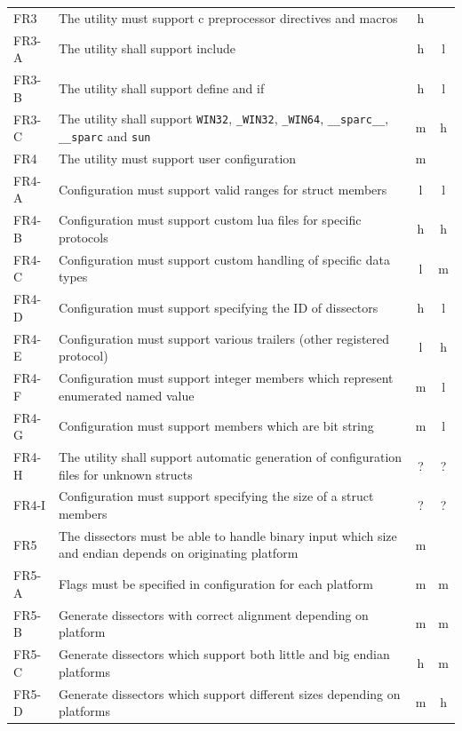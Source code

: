 \begin{table}[htbp]
{\begin{tabularx}{1.2\textwidth}{l X c c}
	\midrule
	FR3 & The \gls{utility} must support \Gls{c} \gls{preprocessor} directives and macros & \Gls{h} & \\
	FR3-A & The \gls{utility} shall support \gls{include} & \Gls{h} & \Gls{l} \\
	FR3-B & The \gls{utility} shall support \gls{define} and \gls{if} & \Gls{h} & \Gls{l} \\
	FR3-C & The \gls{utility} shall support \verb+WIN32+, \verb+_WIN32+, \verb+_WIN64+, \verb+__sparc__+, \verb+__sparc+ and \verb+sun+ & \Gls{m} & \Gls{h} \\
	\midrule
	FR4 & The \gls{utility} must support user configuration & \Gls{m} & \\
	FR4-A & Configuration must support valid ranges for \gls{struct} \glspl{member} & \Gls{l} & \Gls{l} \\
	FR4-B & Configuration must support custom \Gls{lua} files for specific \glspl{protocol} & \Gls{h} & \Gls{h} \\
	FR4-C & Configuration must support custom handling of specific data types & \Gls{l} & \Gls{m} \\
	FR4-D & Configuration must support specifying the ID of \glspl{dissector} & \Gls{h} & \Gls{l} \\
	FR4-E & Configuration must support various trailers (other registered \gls{protocol}) & \Gls{l} & \Gls{h} \\
	FR4-F & Configuration must support integer \glspl{member} which represent enumerated named value & \Gls{m} & \Gls{l} \\	
	FR4-G & Configuration must support \glspl{member} which are \gls{bit string} & \Gls{m} & \Gls{l} \\
	FR4-H & The utility shall support automatic generation of configuration files for unknown structs & ? & ? \\
	FR4-I & Configuration must support specifying the size of a struct members & ? & ? \\
	\midrule
	FR5 & The \glspl{dissector} must be able to handle \gls{binary} input which size and \gls{endian} depends on originating platform & \Gls{m} & \\
	FR5-A & Flags must be specified in configuration for each platform & \Gls{m} & \Gls{m} \\
	FR5-B & Generate \glspl{dissector} with correct alignment depending on platform & \Gls{m} & \Gls{m} \\
	FR5-C & Generate \glspl{dissector} which support both little and big \gls{endian} platforms & \Gls{h} & \Gls{m} \\
	FR5-D & Generate \glspl{dissector} which support different sizes depending on platforms & \Gls{m} & \Gls{h} \\
	\bottomrule
\end{tabularx}}
\end{table}

